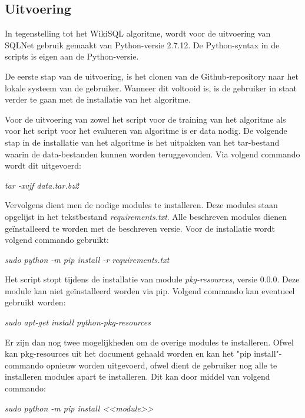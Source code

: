 \subsection{Uitvoering}
\label{sec:uitvsqln}

In tegenstelling tot het WikiSQL algoritme, wordt voor de uitvoering van SQLNet gebruik gemaakt van Python-versie 2.7.12. De Python-syntax in de scripts is eigen aan de Python-versie. 

De eerste stap van de uitvoering, is het clonen van de Github-repository naar het lokale systeem van de gebruiker. Wanneer dit voltooid is, is de gebruiker in staat verder te gaan met de installatie van het algoritme. 

Voor de uitvoering van zowel het script voor de training van het algoritme als voor het script voor het evalueren van algoritme is er data nodig. De volgende stap in de installatie van het algoritme is het uitpakken van het tar-bestand waarin de data-bestanden kunnen worden teruggevonden. Via volgend commando wordt dit uitgevoerd:

\begin{center}
	\textit{tar -xvjf data.tar.bz2}
\end{center}

Vervolgens dient men de nodige modules te installeren. Deze modules staan opgelijst in het tekstbestand \textit{requirements.txt}. Alle beschreven modules dienen geïnstalleerd te worden met de beschreven versie. Voor de installatie wordt volgend commando gebruikt:

\begin{center}
	\textit{sudo python -m pip install -r requirements.txt}
\end{center}

Het script stopt tijdens de installatie van module \textit{pkg-resources}, versie 0.0.0. Deze module kan niet geïnstalleerd worden via pip. Volgend commando kan eventueel gebruikt worden:

\begin{center}
	\textit{sudo apt-get install python-pkg-resources}
\end{center}

Er zijn dan nog twee mogelijkheden om de overige modules te installeren. Ofwel kan pkg-resources uit het document gehaald worden en kan het "pip install"-commando opnieuw worden uitgevoerd, ofwel dient de gebruiker nog alle te installeren modules apart te installeren. Dit kan door middel van volgend commando:

\begin{center}
	\textit{sudo python -m pip install <<module>>}
\end{center}

